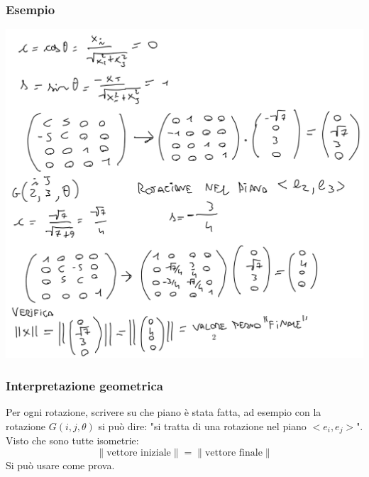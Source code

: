 \documentclass[10pt]{article}
\begin{document}
\subsubsection*{Esempio}
\begin{center}
    \includegraphics[scale=0.3]{givens.png}
\end{center}
\subsubsection{Interpretazione geometrica}
Per ogni rotazione, scrivere su che piano è stata fatta, ad esempio con la rotazione $G(i,j,\theta)$ si può dire: "si tratta di una rotazione nel piano $<e_{i},e_{j}>$". Visto che sono tutte isometrie: \begin{equation*}
    \lVert \text{vettore iniziale} \rVert = \lVert \text{vettore finale} \rVert
\end{equation*}
Si può usare come prova.
\end{document}
